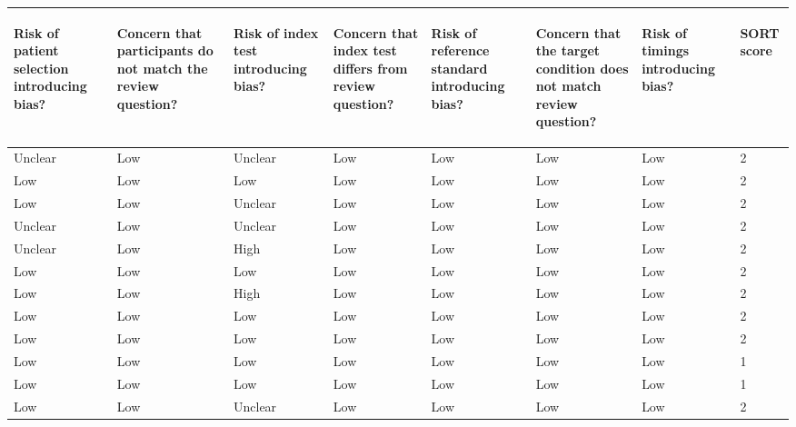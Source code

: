 \begin{table}[ht]
\centering
\begingroup\tiny
\begin{tabular}{llllllll}
  \hline
\begin{sideways} Risk of patient selection introducing bias? \end{sideways} & \begin{sideways} Concern that participants do not match the review question? \end{sideways} & \begin{sideways} Risk of index test introducing bias? \end{sideways} & \begin{sideways} Concern that index test differs from review question? \end{sideways} & \begin{sideways} Risk of reference standard introducing bias? \end{sideways} & \begin{sideways} Concern that the target condition does not match review question? \end{sideways} & \begin{sideways} Risk of timings introducing bias? \end{sideways} & \begin{sideways} SORT score \end{sideways} \\ 
  \hline
Unclear & Low & Unclear & Low & Low & Low & Low & 2 \\ 
  Low & Low & Low & Low & Low & Low & Low & 2 \\ 
  Low & Low & Unclear & Low & Low & Low & Low & 2 \\ 
  Unclear & Low & Unclear & Low & Low & Low & Low & 2 \\ 
  Unclear & Low & High & Low & Low & Low & Low & 2 \\ 
  Low & Low & Low & Low & Low & Low & Low & 2 \\ 
  Low & Low & High & Low & Low & Low & Low & 2 \\ 
  Low & Low & Low & Low & Low & Low & Low & 2 \\ 
  Low & Low & Low & Low & Low & Low & Low & 2 \\ 
  Low & Low & Low & Low & Low & Low & Low & 1 \\ 
  Low & Low & Low & Low & Low & Low & Low & 1 \\ 
  Low & Low & Unclear & Low & Low & Low & Low & 2 \\ 

\end{tabular}
\end{table}
